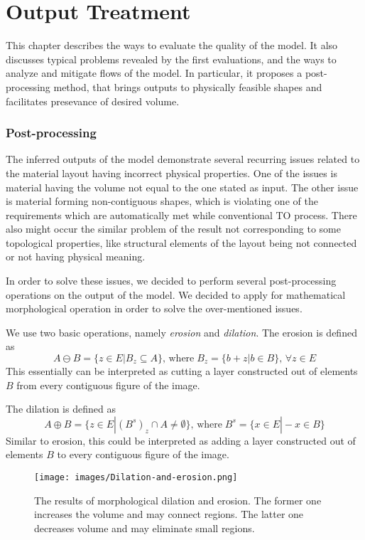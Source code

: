 
\chapter{Output Treatment}

This chapter describes the ways to evaluate the quality of the model.
It also discusses typical problems revealed by the first evaluations, and the ways to analyze and mitigate flows of the model.
In particular, it proposes a post-processing method, that brings outputs to physically feasible shapes and facilitates presevance of desired volume.

\subsection{Post-processing}

The inferred outputs of the model demonstrate several recurring issues related to the material layout having incorrect physical properties.
One of the issues is material having the volume not equal to the one stated as input.
The other issue is material forming non-contiguous shapes, which is violating one of the requirements which are automatically met while conventional TO process.
There also might occur the similar problem of the result not corresponding to some topological properties, like structural elements of the layout being not connected or not having physical meaning.
\medskip

In order to solve these issues, we decided to perform several post-processing operations on the output of the model.
We decided to apply for mathematical morphological operation in order to solve the over-mentioned issues.
\medskip

We use two basic operations, namely \emph{erosion} and \emph{dilation}\cite{bibl:er-dil}.
The erosion is defined as 
\begin{equation}
A \ominus B = \{z \in E | B_{z} \subseteq A \}, \, \mathrm{where} \; B_{z}=\{ b+z | b \in B \}, \, \forall z \in E 
\end{equation} 
This essentially can be interpreted as cutting a layer constructed out of elements $B$ from every contiguous figure of the image.
\medskip

The dilation is defined as 
\begin{equation}
A \oplus B = \{z \in E | (B^{s})_{z} \cap  A \neq \emptyset \}, \, \mathrm{where} \; B^{s}=\{x \in E | -x \in B \}
\end{equation} 
Similar to erosion, this could be interpreted as adding a layer constructed out of elements $B$ to every contiguous figure of the image. 
\medskip
\begin{figure}
	\centering
	\texttt{[image: images/Dilation-and-erosion.png]}
	\label{fig:dil-eros}
	\caption{The results of morphological dilation and erosion. The former one increases the volume and may connect regions. The latter one decreases volume and may eliminate small regions.}
\end{figure}
\medskip

